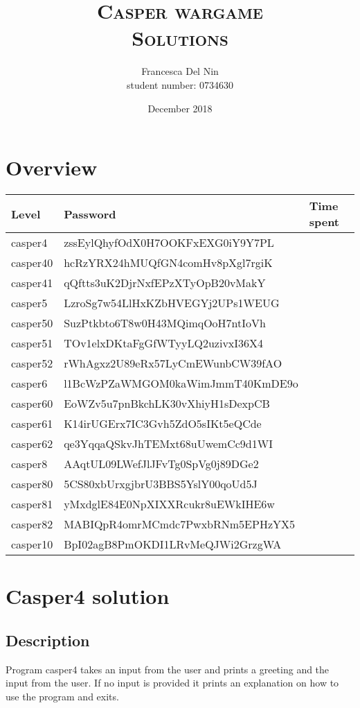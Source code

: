 \documentclass[a4paper,12pt]{article}
\title{\scshape Casper wargame \\ Solutions}
\author{Francesca Del Nin \\ student number: 0734630}
\date{December 2018}
\begin{document}
\maketitle


\section{Overview}
\begin{table}[]
\begin{tabular}{l|l|l}
 Level & Password & Time spent  \\
 \hline
 casper4 & zssEylQhyfOdX0H7OOKFxEXG0iY9Y7PL &   \\
 casper40 & hcRzYRX24hMUQfGN4comHv8pXgl7rgiK & \\
 casper41 & qQftts3uK2DjrNxfEPzXTyOpB20vMakY &   \\
 casper5 & LzroSg7w54LlHxKZbHVEGYj2UPs1WEUG & \\
 casper50 & SuzPtkbto6T8w0H43MQimqOoH7ntIoVh & \\
 casper51 & TOv1elxDKtaFgGfWTyyLQ2uzivxI36X4 & \\
 casper52 & rWhAgxz2U89eRx57LyCmEWunbCW39fAO & \\
 casper6 & l1BcWzPZaWMGOM0kaWimJmmT40KmDE9o &  \\
 casper60 & EoWZv5u7pnBkchLK30vXhiyH1sDexpCB & \\
 casper61 & K14irUGErx7IC3Gvh5ZdO5sIKt5eQCde & \\
 casper62 & qe3YqqaQSkvJhTEMxt68uUwemCc9d1WI & \\
 casper8 & AAqtUL09LWefJlJFvTg0SpVg0j89DGe2 & \\
 casper80 & 5CS80xbUrxgjbrU3BBS5YslY00qoUd5J & \\
 casper81 & yMxdglE84E0NpXIXXRcukr8uEWkIHE6w & \\
 casper82 & MABIQpR4omrMCmdc7PwxbRNm5EPHzYX5 & \\
 casper10 & BpI02agB8PmOKDI1LRvMeQJWi2GrzgWA &\\
\end{tabular}
\end{table}

\newpage
\section{Casper4 solution}
\subsection{Description}
Program casper4 takes an input from the user and prints a greeting and the input from the user. If no input is provided it prints an explanation on how to use the program and exits.
 
\end{document}
